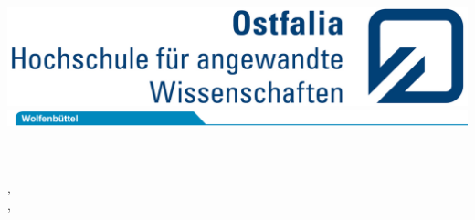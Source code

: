 % 
%
\begin{titlepage}
	\vspace*{-3.0cm}
	\hspace*{ 6.90cm}\includegraphics[scale=0.93]{../ostfalia/Ostfalia_LS_RGB_klein.jpg}\\
	\hspace*{-1.00cm}\includegraphics[scale=1.20]{../ostfalia/Reiter_Wolfen_RGB_174mm.jpg}\\
	
	\\
	
	\hrulefill\\
	
	\begin{flushleft}
	{\Large\textsf{\authorMarco, \matrNumberMarco\\}}
	{\Large\textsf{\authorNiklas, \matrNumberNiklas\\}}
	\end{flushleft}
	
	
	
	
	
	\vspace{2em}
	\textbf{
	\textsf{\huge\titel \\[0.3ex]}}
	\textsf{\hspace*{0.5cm}\large \subtitel \\[0.05cm]}
	

\end{titlepage}
